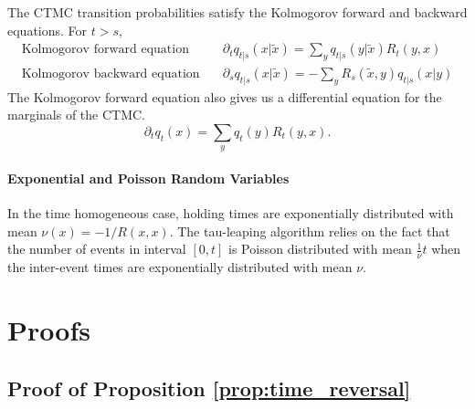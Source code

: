 \documentclass{article}
\begin{document}
The CTMC transition probabilities satisfy the Kolmogorov forward and backward equations. For $t > s$,
\begin{align}
    \text{Kolmogorov forward equation} \quad &\partial_t q_{t|s}(x | \tilde{x}) = \sum_{y} q_{t|s}(y | \tilde{x}) R_t(y, x)\\
    \text{Kolmogorov backward equation} \quad &\partial_s q_{t|s}(x | \tilde{x}) = - \sum_{y} R_s(\tilde{x}, y) q_{t|s}(x | y)
\end{align}
The Kolmogorov forward equation also gives us a differential equation for the marginals of the CTMC.
\begin{equation}
    \partial_t q_t(x) = \sum_{y} q_t(y) R_t(y, x).
\end{equation}

\paragraph{Exponential and Poisson Random Variables} In the time homogeneous case, holding times are exponentially distributed with mean $\nu(x) = -1 / R(x, x)$. The tau-leaping algorithm relies on the fact that the number of events in interval $[0, t]$ is Poisson distributed with mean $\frac{1}{\nu} t$ when the inter-event times are exponentially distributed with mean $\nu$.


\section{Proofs} \label{sec:ApdxProofs}

\subsection{Proof of Proposition \ref{prop:time_reversal}}
\end{document}
